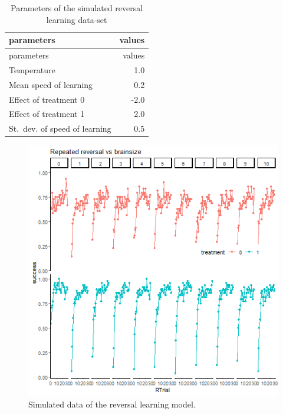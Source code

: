 \documentclass[
]{article}
\begin{document}
\begin{longtable}[]{@{}lr@{}}
\caption{\label{tab:param_rev} Parameters of the simulated reversal
learning data-set}\tabularnewline
\toprule\noalign{}
parameters & values \\
\midrule\noalign{}
\endfirsthead
\toprule\noalign{}
parameters & values \\
\midrule\noalign{}
\endhead
\bottomrule\noalign{}
\endlastfoot
Temperature & 1.0 \\
Mean speed of learning & 0.2 \\
Effect of treatment 0 & -2.0 \\
Effect of treatment 1 & 2.0 \\
St.~dev. of speed of learning & 0.5 \\
\end{longtable}

\begin{figure}

\includegraphics[width=6.67in,]{images/reversal_data} \hfill{}

\caption{Simulated data of the reversal learning model.}\label{fig:rev_sim_data}
\end{figure}
\end{document}

